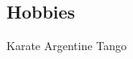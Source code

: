 \documentclass[margin]{res}
\begin{document}
\begin{resume}

\section{Hobbies}
    Karate \textbullet{}
    Argentine Tango

\end{resume} 
\end{document}
